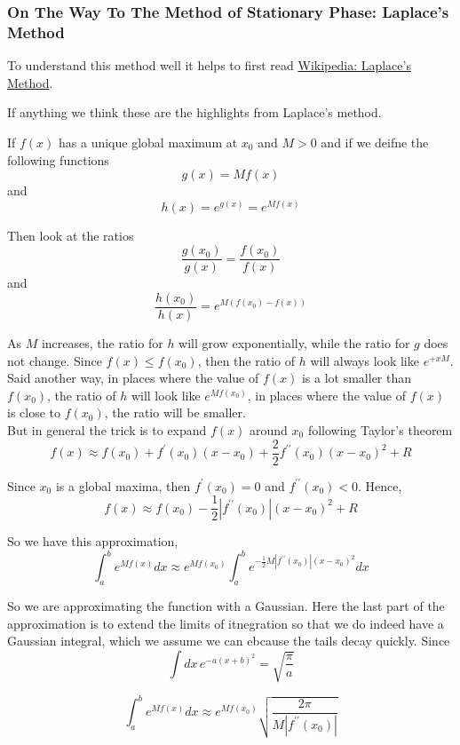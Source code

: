 \subsubsection{On The Way To The Method of Stationary Phase: Laplace's Method}

To understand this method well it helps to first read
\href{https://en.wikipedia.org/wiki/Laplace%27s_method}{Wikipedia: Laplace's Method}.

If anything we think these are the highlights from Laplace's method.

If $f(x)$ has a unique global maximum at $x_0$ and $M>0$ and if we deifne the following functions
$$
g(x) = Mf(x)
$$
and
$$
h(x) = e^{g(x)} = e^{Mf(x)}
$$

Then look at the ratios
$$
\frac{g(x_0)}{g(x)} = \frac{f(x_0)}{f(x)}
$$
and
$$
\frac{h(x_0)}{h(x)} = e^{M(f(x_0) - f(x))}
$$

As $M$ increases, the ratio for $h$ will grow exponentially, while the ratio for $g$ does not change.
Since $f(x) \leq f(x_0)$, then the ratio of $h$ will always look like $e^{+{x}M}$.
Said another way, in places where the value of $f(x)$ is a lot smaller than $f(x_0)$, the ratio of $h$ will look like
$e^{Mf(x_0)}$, in places where the value of $f(x)$ is close to $f(x_0)$, the ratio will be smaller.
\\

But in general the trick is to expand $f(x)$ around $x_0$ following Taylor's theorem
$$
f(x) \approx
    f(x_0) + f^{\prime} (x_0) (x-x_0) + \frac{2}{2} f^{\prime\prime} (x_0) (x-x_0)^2 + R
$$

Since $x_0$ is a global maxima, then $f^{\prime} (x_0) = 0$ and $f^{\prime\prime} (x_0) < 0$.
Hence,
$$
f(x) \approx
    f(x_0) - \frac{1}{2} |f^{\prime\prime} (x_0)| (x-x_0)^2 + R
$$

So we have this approximation,
$$
\int_{a}^{b} e^{Mf(x)} dx \approx
    e^{Mf(x_0)} \int_{a}^{b} e^{- \frac{1}{2} M |f^{\prime\prime} (x_0)| (x-x_0)^2} dx
$$

So we are approximating the function with a Gaussian.
Here the last part of the approximation is to extend the limits of itnegration so that we do indeed have a Gaussian integral,
which we assume we can ebcause the tails decay quickly.
Since
$$
\int dx\, e^{-a(x+b)^2} = \sqrt{ \frac{\pi}{a} }
$$

$$
\int_{a}^{b} e^{Mf(x)} dx \approx
    e^{Mf(x_0)} \sqrt{ \frac{2\pi}{M |f^{\prime\prime} (x_0)|} }
$$

